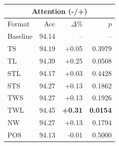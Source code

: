 \begin{tabular}{lrrr}
\toprule
\multicolumn{4}{c}{\textbf{Attention (-/+)}} \\
\midrule
Format & Acc & $\Delta$\% & $p$ \\
\midrule
Baseline & 94.14 & -- & -- \\
\midrule
TS & 94.19 & +0.05 & 0.3979 \\
TL & 94.39 & +0.25 & 0.0508 \\
STL & 94.17 & +0.03 & 0.4428 \\
STS & 94.27 & +0.13 & 0.1862 \\
TWS & 94.27 & +0.13 & 0.1926 \\
TWL & 94.45 & \textbf{+0.31} & \textbf{0.0154} \\
NW & 94.27 & +0.13 & 0.1794 \\
POS & 94.13 & -0.01 & 0.5000 \\
\bottomrule
\end{tabular}